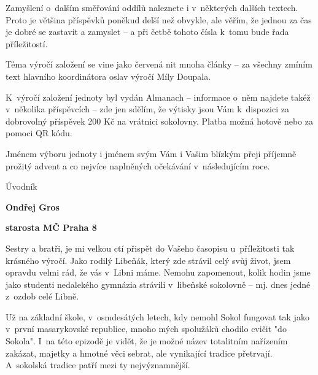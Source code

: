 \documentclass[11pt]{article}
\begin{document}
Zamyšlení o~dalším směřování oddílů naleznete i v~některých dalších textech. Proto je většina příspěvků poněkud delší než obvykle, ale věřím, že jednou za čas je dobré se zastavit a zamyslet – a při četbě tohoto čísla k~tomu bude řada příležitostí. 

Téma výročí založení se vine jako červená nit mnoha články – za všechny zmíním text hlavního koordinátora oslav výročí Míly Doupala. 

K~výročí založení jednoty byl vydán Almanach – informace o~něm najdete takéž v~několika příspěvcích – zde jen sdělím, že výtisky jsou Vám k~dispozici za dobrovolný příspěvek 200 Kč na vrátnici sokolovny. Platba možná hotově nebo za pomoci QR kódu. 

Jménem výboru jednoty i jménem svým Vám i Vašim blízkým přeji příjemně prožitý advent a co nejvíce naplněných očekávání v~následujícím roce.



\clearpage

\pagestyle{uvodnik}



\setlength{\columnsep}{-2.5cm}
\begin{multicols}{2}
  {\fontsize{48pt}{57pt} \fugner \color{sokolred} \noindent Úvodník}

  \columnbreak

  \vspace*{-4pt}

  {\hfill\textbf{Ondřej Gros}}
  
  {\hfill\textbf{starosta MČ Praha 8}}
 \end{multicols}

\vspace*{12pt}

\noindent
Sestry a bratři, 
\noindent
je mi velkou ctí přispět do Vašeho časopisu u~příležitosti tak krásného výročí. Jako rodilý Libeňák, který zde strávil celý svůj život, jsem opravdu velmi rád, že vás v~Libni máme. Nemohu zapomenout, kolik hodin jsme jako studenti nedalekého gymnázia strávili v~libeňské sokolovně – mj. dnes jedné z~ozdob celé Libně.

Už na základní škole, v~osmdesátých letech, kdy nemohl Sokol fungovat tak jako v~první masarykovské republice, mnoho mých spolužáků chodilo cvičit "do Sokola". I~na této epizodě je vidět, že je možné název totalitním nařízením zakázat, majetky a hmotné věci sebrat, ale vynikající tradice přetrvají. A~sokolská tradice patří mezi ty nejvýznamnější.
\end{document}

